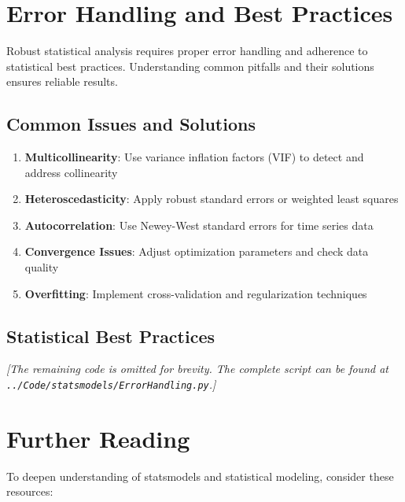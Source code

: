 \section{Error Handling and Best Practices}
\label{sec:best_practices}

Robust statistical analysis requires proper error handling and adherence to statistical best practices. Understanding common pitfalls and their solutions ensures reliable results.

\subsection{Common Issues and Solutions}
\label{subsec:common_issues}

\begin{enumerate}
	\item \textbf{Multicollinearity}: Use variance inflation factors (VIF) to detect and address collinearity
	\item \textbf{Heteroscedasticity}: Apply robust standard errors or weighted least squares
	\item \textbf{Autocorrelation}: Use Newey-West standard errors for time series data
	\item \textbf{Convergence Issues}: Adjust optimization parameters and check data quality
	\item \textbf{Overfitting}: Implement cross-validation and regularization techniques
\end{enumerate}

\subsection{Statistical Best Practices}
\label{subsec:statistical_practices}



\noindent\textit{[The remaining code is omitted for brevity. The complete script can be found at \texttt{../Code/statsmodels/ErrorHandling.py}.]}

\section{Further Reading}
\label{sec:further_reading}

To deepen understanding of statsmodels and statistical modeling, consider these resources:

